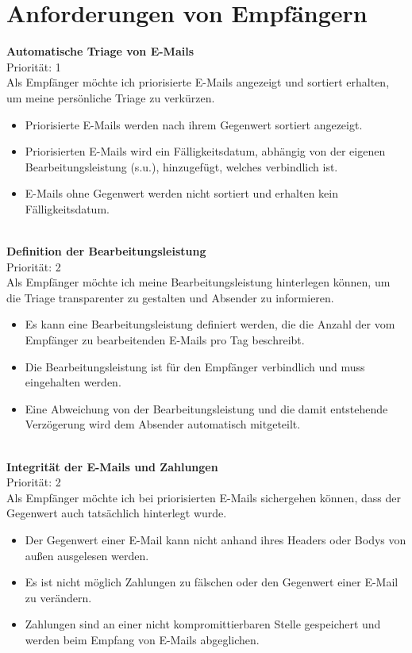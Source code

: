 \section{Anforderungen von Empfängern}
\label{Anforderungen_von_Empfaengern}


\textbf{Automatische Triage von E-Mails} \\
Priorität: 1 \\
Als Empfänger möchte ich priorisierte E-Mails angezeigt und sortiert erhalten, um meine persönliche Triage zu verkürzen.
\begin{itemize}
    \item Priorisierte E-Mails werden nach ihrem Gegenwert sortiert angezeigt.
    \item Priorisierten E-Mails wird ein Fälligkeitsdatum, abhängig von der eigenen Bearbeitungsleistung (s.u.), hinzugefügt, welches verbindlich ist.
    \item E-Mails ohne Gegenwert werden nicht sortiert und erhalten kein Fälligkeitsdatum.
\end{itemize}

\noindent
\\ \textbf{Definition der Bearbeitungsleistung} \\
Priorität: 2 \\
Als Empfänger möchte ich meine Bearbeitungsleistung hinterlegen können, um die Triage transparenter zu gestalten und Absender zu informieren.
\begin{itemize}
    \item Es kann eine Bearbeitungsleistung definiert werden, die die Anzahl der vom Empfänger zu bearbeitenden E-Mails pro Tag beschreibt.
    \item Die Bearbeitungsleistung ist für den Empfänger verbindlich und muss eingehalten werden.
    \item Eine Abweichung von der Bearbeitungsleistung und die damit entstehende Verzögerung wird dem Absender automatisch mitgeteilt.
\end{itemize}

\noindent
\\ \textbf{Integrität der E-Mails und Zahlungen} \\
Priorität: 2 \\
Als Empfänger möchte ich bei priorisierten E-Mails sichergehen können, dass der  Gegenwert auch tatsächlich hinterlegt wurde.
\begin{itemize}
    \item Der Gegenwert einer E-Mail kann nicht anhand ihres Headers oder Bodys von außen ausgelesen werden.
    \item Es ist nicht möglich Zahlungen zu fälschen oder den Gegenwert einer E-Mail zu verändern.
    \item Zahlungen sind an einer nicht kompromittierbaren Stelle gespeichert und werden beim Empfang von E-Mails abgeglichen.
\end{itemize}

